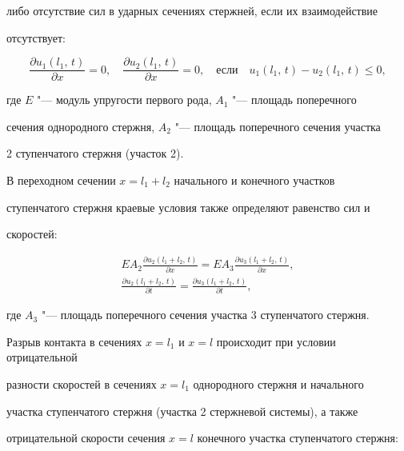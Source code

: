 либо отсутствие сил в ударных сечениях стержней, если их взаимодействие

отсутствует:

\begin{equation}

\label{bit10:6}

\frac{\partial u_1 (l_1,\,t)}{\partial x}=0, \quad

\frac{\partial u_2 (l_1,\,t)}{\partial x}=0, \quad \text{если} \quad u_1 (l_1,\,t)-u_2

(l_1,\,t)\le 0,

\end{equation}

где $E$ "--- модуль упругости первого рода, $A_1$ "--- площадь поперечного

сечения однородного стержня, $A_2$ "--- площадь поперечного сечения участка

2 ступенчатого стержня (участок 2).



В переходном сечении $x = l_1 + l_2$ начального и конечного участков

ступенчатого стержня краевые условия также определяют равенство сил и

скоростей:

\begin{gather}

\label{bit10:7}

E A_2 \frac{\partial u_2 (l_1 + l_2,\,t)}{\partial x}=E A_3 \frac{\partial u_3

(l_1+l_2,\,t)}{\partial x},\\

\label{bit10:8}

\frac{\partial u_2 (l_1 +l_2,\,t)}{\partial t}=\frac{\partial u_3 (l_1

+ l_2,\,t)}{\partial t},

\end{gather}

где $A_3$ "--- площадь поперечного сечения участка 3 ступенчатого стержня.



Разрыв контакта в сечениях $x =l_{1}$  и $x = l$ происходит при условии отрицательной

разности скоростей в сечениях $x = l_{1}$ однородного стержня и начального

участка ступенчатого стержня (участка 2 стержневой системы), а также

отрицательной скорости сечения $x=l$ конечного участка ступенчатого стержня:

